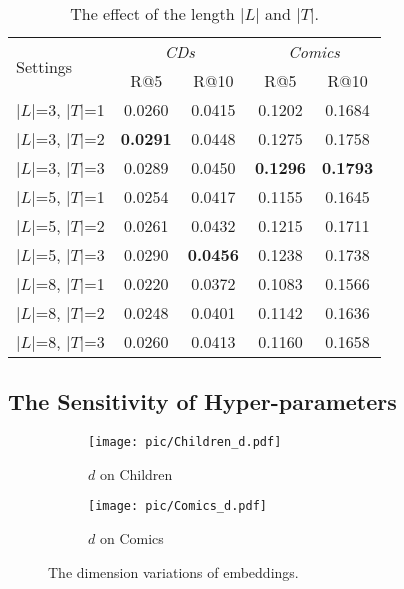 \documentclass[sigconf]{acmart}
\begin{document}
\begin{table}[ht]
\centering
\caption{\label{tab:L_and_T}The effect of the length $ |L| $ and $ |T| $.}
\begin{tabular}{ |l|c|c|c|c| }
\hline
\multirow{2}{*}{Settings} & \multicolumn{2}{c|}{\textit{CDs}} & \multicolumn{2}{c|}{\textit{Comics}} \bigstrut \\\cline{2-5} 
& R@5 & R@10 & R@5 & R@10 \bigstrut \\ 
\hline
$|L|$=3, $|T|$=1 & 0.0260 & 0.0415 & 0.1202 & 0.1684 \\
$|L|$=3, $|T|$=2 & \textbf{0.0291} & 0.0448 & 0.1275 & 0.1758 \\
$|L|$=3, $|T|$=3 & 0.0289 & 0.0450 & \textbf{0.1296} & \textbf{0.1793} \\
$|L|$=5, $|T|$=1 & 0.0254 & 0.0417 & 0.1155 & 0.1645 \\
$|L|$=5, $|T|$=2 & 0.0261 & 0.0432 & 0.1215 & 0.1711 \\
$|L|$=5, $|T|$=3 & 0.0290 & \textbf{0.0456} & 0.1238 & 0.1738 \\
$|L|$=8, $|T|$=1 & 0.0220 & 0.0372 & 0.1083 & 0.1566 \\
$|L|$=8, $|T|$=2 & 0.0248 & 0.0401 & 0.1142 & 0.1636 \\
$|L|$=8, $|T|$=3 & 0.0260 & 0.0413 & 0.1160 & 0.1658 \\
\hline
\end{tabular}
\vspace{-0.3cm}
\end{table}

\subsection{The Sensitivity of Hyper-parameters} \label{subsec:parameter_sensitivity}

\begin{figure}[t!]
    \centering
    \begin{subfigure}[t]{0.25\textwidth}
        \centering
        \texttt{[image: pic/Children\_d.pdf]}
        \caption{\label{fig:CDs_da_var}$ d $ on Children}
    \end{subfigure}\begin{subfigure}[t]{0.25\textwidth}
        \centering
        \texttt{[image: pic/Comics\_d.pdf]}
        \caption{\label{fig:Foursquare_da_var}$ d $ on Comics}
    \end{subfigure}
    \caption{\label{fig:d_var}The dimension variations of embeddings.}
\vspace{-0.3cm}
\end{figure}
\end{document}
